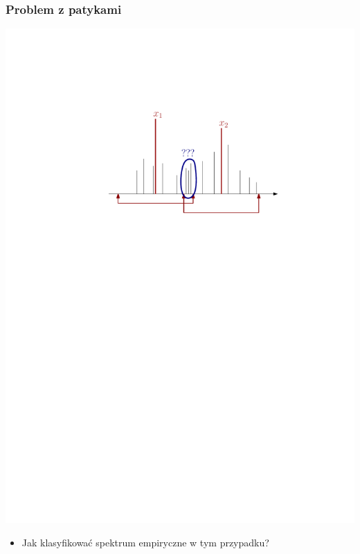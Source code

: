 \documentclass[xetex]{beamer}
\begin{document}
	\begin{frame}\frametitle{Problem z patykami}
	    

	    \begin{center}
	        \includegraphics[height=.5\textheight,keepaspectratio]{./picts/sticks3}
	    \end{center}

		\begin{itemize}
			\item Jak klasyfikować spektrum empiryczne w tym przypadku?
		\end{itemize}

	\end{frame}
\end{document}

